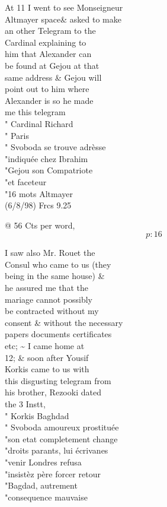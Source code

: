 \documentclass{report}
\begin{document}
	\par{
 	At 11 I went to see Monseigneur\ \\Altmayer \lbrack space\rbrack \& asked to make\ \\an other Telegram to the\ \\Cardinal explaining to\ \\him that Alexander can\ \\be found at Gejou at that\ \\same address \& Gejou will\ \\point out to him where\ \\Alexander is so he made\ \\me this telegram\ \\" Cardinal Richard\ \\" Paris\ \\" Svoboda se trouve adrèsse\ \\"indiquée chez Ibrahim\ \\"Gejou son Compatriote\ \\"et faceteur\ \\"16 mots Altmayer\ \\(6/8/98) Frcs 9.25\ \\
	}

	\par{
 	@ 56 Cts per word,\ \\
  \[p: 16 \]

	}

	\par{
 	I saw also Mr. Rouet the\ \\Consul who came to us (they\ \\being in the same house) \&\ \\he assured me that the\ \\mariage cannot possibly\ \\be contracted without my\ \\consent \& without the necessary\ \\papers documents certificates\ \\etc; \~{} I came home at\ \\12; \& soon after Yousif\ \\Korkis came to us with\ \\this disgusting telegram from\ \\his brother, Rezooki dated\ \\the 3 Instt,\ \\" Korkis Baghdad\ \\" Svoboda amoureux prostituée\ \\"son etat completement change\ \\"droits parants, lui écrivanes\ \\"venir Londres refusa\ \\"insistèz père forcer retour\ \\"Bagdad, autrement\ \\"consequence mauvaise\ \\
	}
\end{document}
